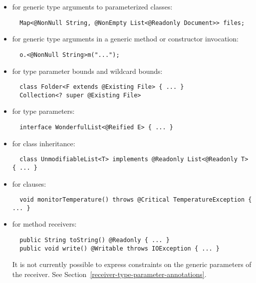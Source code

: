 \documentclass[10pt]{article}
\begin{document}
\begin{itemize}

\item for generic type arguments to parameterized classes:
\preverbnegspace
\begin{Verbatim}
  Map<@NonNull String, @NonEmpty List<@Readonly Document>> files;
\end{Verbatim}

\item for generic type arguments in a generic method or constructor invocation:
\preverbnegspace
\begin{Verbatim}
  o.<@NonNull String>m("...");
\end{Verbatim}

\item for type parameter bounds and wildcard bounds:
\preverbnegspace
\begin{Verbatim}
  class Folder<F extends @Existing File> { ... }
  Collection<? super @Existing File>
\end{Verbatim}

\item for type parameters:
\preverbnegspace
\begin{Verbatim}
  interface WonderfulList<@Reified E> { ... }
\end{Verbatim}

\item for class inheritance:
\preverbnegspace
\begin{Verbatim}
  class UnmodifiableList<T> implements @Readonly List<@Readonly T> { ... }
\end{Verbatim}

\item for  clauses:
\preverbnegspace
\begin{Verbatim}
  void monitorTemperature() throws @Critical TemperatureException { ... }
\end{Verbatim}

\item for method receivers:
\preverbnegspace
\begin{Verbatim}
  public String toString() @Readonly { ... }
  public void write() @Writable throws IOException { ... }
\end{Verbatim}

\preverbnegspace
It is not currently possible to express constraints on the generic
parameters of the receiver.  See
Section~\ref{receiver-type-parameter-annotations}.


\end{itemize}
\end{document}
